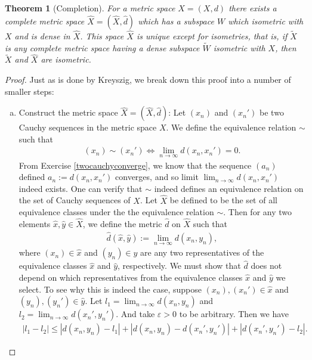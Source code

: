 \documentclass[11pt]{article}
\theoremstyle{mystyle}
\newtheorem{thm}{Theorem}[section]
\newcommand{\0}{\mathbf{0}}
\begin{document}
\begin{thm}[Completion]\label{completion}
For a metric space $X = (X, d)$ there exists a complete metric space $\hat{X} = (\hat{X}, \hat{d})$ which has a subspace $W$ which isometric with $X$ and is dense in $\hat{X}$. This space $\hat{X}$ is unique except for isometries, that is, if $\tilde{X}$ is any complete metric space having a dense subspace $\tilde{W}$ isometric with $X$, then $\tilde{X}$ and $\hat{X}$ are isometric.
\end{thm}
\begin{proof}
Just as is done by Kreyszig, we break down this proof into a number of smaller steps:
\begin{enumerate}[(a)] 
\item Construct the metric space $\hat{X} = (\hat{X}, \hat{d})$:\newline
Let $(x_n)$ and $(x_n')$ be two Cauchy sequences in the metric space $X$. We define the equivalence relation $\sim$ such that 
\begin{align*}
 (x_n) \sim (x_n') \iff \lim_{n \longrightarrow \infty} d(x_n, x_n') = 0.   
\end{align*}
From Exercise \ref{twocauchyconverge}, we know that the sequence $(a_n)$ defined $a_n := d(x_n, x_n')$ converges, and so limit $\lim_{n \longrightarrow \infty} d(x_n, x_n')$ indeed exists. One can verify that $\sim$ indeed defines an equivalence relation on the set of Cauchy sequences of $X$.\newline
Let $\hat{X}$ be defined to be the set of all equivalence classes under the the equivalence relation $\sim$. Then for any two elements $\hat{x}, \hat{y} \in \hat{X}$, we define the metric $\hat{d}$ on $\hat{X}$ such that
\begin{align*}
    \hat{d}(\hat{x}, \hat{y}) := \lim_{n \to \infty} d(x_n, y_n),
\end{align*}
where $(x_n) \in \hat{x}$ and $(y_n) \in \hat{y}$ are any two representatives of the equivalence classes $\hat{x}$ and $\hat{y}$, respectively. We must show that $\hat{d}$ does not depend on which representatives from the equivalence classes $\hat{x}$ and $\hat{y}$ we select.\newline 
To see why this is indeed the case, suppose $(x_n), (x_n') \in \hat{x}$ and $(y_n), (y_n') \in \hat{y}$. Let $l_1 = \lim_{n \to \infty} d(x_n, y_n)$ and $l_2 = \lim_{n \to \infty} d(x_n', y_n')$. And take $\varepsilon > 0$ to be arbitrary. Then we have
\begin{align*}
    |l_1 - l_2| \leq |d(x_n, y_n) - l_1|  + |d(x_n, y_n)  - d(x_n', y_n')| + |d(x_n', y_n') - l_2|.

\end{align*}
\end{enumerate}
\end{proof}
\end{document}
